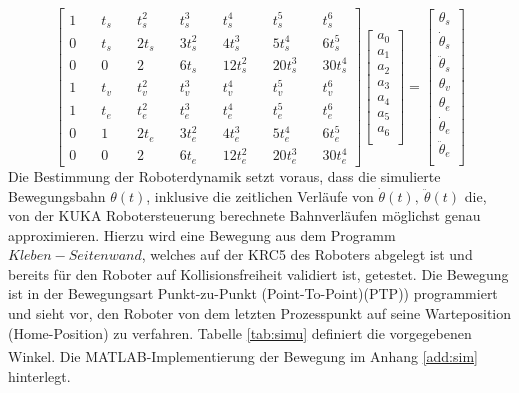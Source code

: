 \begin{equation}
	\label{eqn:lgs}
	\left[	\begin{matrix}
		1&\quad    t_s&\quad          	t_s^2&\quad              	t_s^3&\quad         	t_s^4&\quad              	t_s^5&\quad          	t_s^6\\
		0&\quad    t_s&\quad          	2t_s&\quad              	3t_s^2&\quad        	4t_s^3&\quad            	5t_s^4&\quad        	6t_s^5\\
		0&\quad    0&\quad         		2&\quad              	  	6t_s&\quad         	 	12t_s^2&\quad           	20t_s^3&\quad       	30t_s^4\\
		1&\quad    t_v&\quad         	t_v^2&\quad              	t_v^3&\quad         	t_v^4&\quad             	t_v^5&\quad          	t_v^6\\
		1&\quad    t_e&\quad        	t_e^2&\quad              	t_e^3&\quad          	t_e^4&\quad             	t_e^5&\quad          	t_e^6\\
		0&\quad    1&\quad   	   		2t_e&\quad              	3t_e^2&\quad        	4t_e^3&\quad           		5t_e^4&\quad        	6t_e^5\\   
		0&\quad    0&\quad          	2&\quad                 	6t_e&\quad          	12t_e^2&\quad           	20t_e^3&\quad       	30t_e^4
	\end{matrix}\right]
	\left[	\begin{matrix}
		a_0\\
		a_1\\
		a_2\\
		a_3\\
		a_4\\
		a_5\\
		a_6\\		
	\end{matrix}\right] = 
		\left[	\begin{matrix}
		\theta_s\\
		\dot{\theta}_s\\
		\ddot{\theta}_s\\
		\theta_v\\
		\theta_e\\
		\dot{\theta}_e\\
		\ddot{\theta}_e\\		
	\end{matrix}\right]
\end{equation}
%
Die Bestimmung der Roboterdynamik setzt voraus, dass die simulierte Bewegungsbahn $\theta(t)$, inklusive die zeitlichen Verläufe von $\dot{\theta}(t), ~\ddot{\theta}(t)$  die, von der KUKA Robotersteuerung berechnete Bahnverläufen möglichst genau approximieren. Hierzu wird eine Bewegung aus dem Programm $Kleben-Seitenwand$, welches auf der KRC5 des Roboters abgelegt ist und bereits für den Roboter auf Kollisionsfreiheit validiert ist, getestet. Die Bewegung ist in der Bewegungsart  Punkt-zu-Punkt (Point-To-Point)(PTP)) programmiert und sieht vor, den Roboter von dem letzten Prozesspunkt auf seine Warteposition (Home-Position) zu verfahren. Tabelle \ref{tab:simu} definiert die vorgegebenen Winkel. Die MATLAB\textsuperscript{\textregistered}-Implementierung der Bewegung im Anhang \ref{add:sim} hinterlegt.
